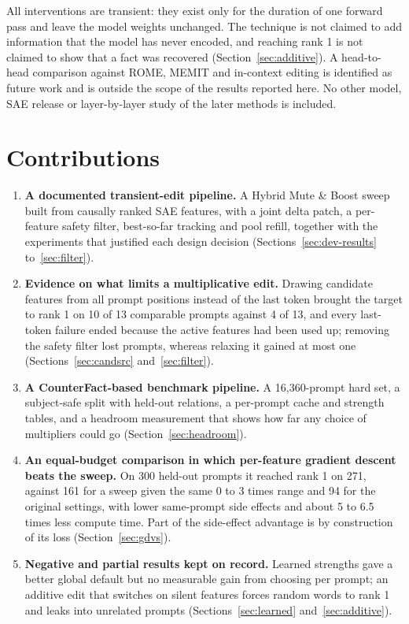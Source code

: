 \documentclass[12pt,a4paper]{report}
\begin{document}
All interventions are transient: they exist only for the duration of one forward pass and leave the model weights unchanged. The technique is not claimed to add information that the model has never encoded, and reaching rank 1 is not claimed to show that a fact was recovered (Section~\ref{sec:additive}). A head-to-head comparison against ROME, MEMIT and in-context editing is identified as future work and is outside the scope of the results reported here. No other model, SAE release or layer-by-layer study of the later methods is included.

\section{Contributions}

\begin{enumerate}
  \item \textbf{A documented transient-edit pipeline.} A Hybrid Mute \& Boost sweep built from causally ranked SAE features, with a joint delta patch, a per-feature safety filter, best-so-far tracking and pool refill, together with the experiments that justified each design decision (Sections~\ref{sec:dev-results} to~\ref{sec:filter}).
  \item \textbf{Evidence on what limits a multiplicative edit.} Drawing candidate features from all prompt positions instead of the last token brought the target to rank 1 on 10 of 13 comparable prompts against 4 of 13, and every last-token failure ended because the active features had been used up; removing the safety filter lost prompts, whereas relaxing it gained at most one (Sections~\ref{sec:candsrc} and~\ref{sec:filter}).
  \item \textbf{A CounterFact-based benchmark pipeline.} A 16,360-prompt hard set, a subject-safe split with held-out relations, a per-prompt cache and strength tables, and a headroom measurement that shows how far any choice of multipliers could go (Section~\ref{sec:headroom}).
  \item \textbf{An equal-budget comparison in which per-feature gradient descent beats the sweep.} On 300 held-out prompts it reached rank 1 on 271, against 161 for a sweep given the same 0 to 3 times range and 94 for the original settings, with lower same-prompt side effects and about 5 to 6.5 times less compute time. Part of the side-effect advantage is by construction of its loss (Section~\ref{sec:gdvs}).
  \item \textbf{Negative and partial results kept on record.} Learned strengths gave a better global default but no measurable gain from choosing per prompt; an additive edit that switches on silent features forces random words to rank 1 and leaks into unrelated prompts (Sections~\ref{sec:learned} and~\ref{sec:additive}).

\end{enumerate}
\end{document}
